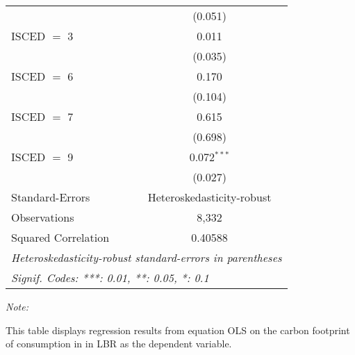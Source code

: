 \begin{table}[htbp!]
\begin{adjustbox}{width = 1\textwidth, max height = 0.95\textheight, center}
\begin{threeparttable}[b]
\begin{tabular}{lc}
                                & (0.051)\\   
            ISCED $=$ 3         & 0.011\\   
                                & (0.035)\\   
            ISCED $=$ 6         & 0.170\\   
                                & (0.104)\\   
            ISCED $=$ 7         & 0.615\\   
                                & (0.698)\\   
            ISCED $=$ 9         & 0.072$^{***}$\\   
                                & (0.027)\\   
            \midrule 
            Standard-Errors     & Heteroskedasticity-robust \\   
            Observations        & 8,332\\  
            Squared Correlation & 0.40588\\  
            \midrule \midrule
            \multicolumn{2}{l}{\emph{Heteroskedasticity-robust standard-errors in parentheses}}\\
            \multicolumn{2}{l}{\emph{Signif. Codes: ***: 0.01, **: 0.05, *: 0.1}}\\
         \end{tabular}
         
         \begin{tablenotes}\item \medskip \textit{Note:}
            \item This table displays regression results from equation OLS on the carbon footprint of consumption in  in LBR as the dependent variable.  
         \end{tablenotes}
      \end{threeparttable}
   \end{adjustbox}
\end{table}


